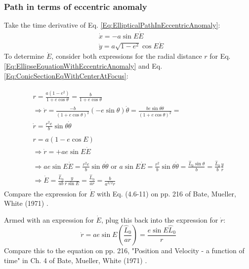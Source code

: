 \documentclass[10pt]{amsart}
\begin{document}
\begin{multicols*}{2}
\subsubsection{Path in terms of eccentric anomaly}

Take the time derivative of Eq. \ref{Eq:EllipticalPathInEccentricAnomaly}:
\begin{equation}
\begin{aligned}
& \dot{x} = -a \sin{E} \dot{E} \\ 
& \dot{y} = a\sqrt{1 - e^2} \cos{E} \dot{E} 
\end{aligned} 
\end{equation}
To determine $\dot{E}$, consider both expressions for the radial distance $r$ for Eq. \ref{Eq:EllipseEquationWithEccentricAnomaly} and Eq. \ref{Eq:ConicSectionEqWithCenterAtFocus}:

\[
\begin{gathered} 
\begin{gathered} 
	r = \frac{a (1-e^2) }{ 1 + e\cos{\theta}} = \frac{b}{ 1 + e\cos{\theta}} \\
	\Longrightarrow \dot{r} = \frac{ -b}{ (1+e\cos{\theta})^2} (-e\sin{\theta})\dot{\theta} = \frac{ be \sin{\theta} \dot{\theta} }{ (1+ e\cos{\theta})^2 } = \\
		\dot{r} = \frac{r^2 e}{b} \sin{\theta} \dot{\theta}
\end{gathered} \\ 
\begin{gathered}
r = a(1 - e\cos{E}) \\
\Longrightarrow \dot{r}  = +ae\sin{E} \dot{E} 
\end{gathered} \\
\begin{gathered}
\Longrightarrow ae \sin{E} \dot{E} = \frac{r^2 e}{b} \sin{\theta} \dot{\theta} \text{ or } a\sin{E} \dot{E} = \frac{r^2}{b} \sin{\theta} \dot{\theta} = \frac{ \widehat{L}_0 \sin{\theta} }{ b} = \frac{\widehat{L}_0 }{b} \frac{y}{r} \\
\Longrightarrow \dot{E} = \frac{ \widehat{L}_0 }{ab} \frac{y}{r\sin{E}} = \frac{\widehat{L}_0 } {ar} = \frac{ b}{ a^{3/2} r} 
\end{gathered}
\end{gathered} 
\]
Compare the expression for $\dot{E}$ with Eq. (4.6-11) on pp. 216 of Bate, Mueller, White (1971) \cite{BMW1971}.

Armed with an expression for $\dot{E}$, plug this back into the expression for $\dot{r}$:
\begin{equation}
\dot{r} = a e \sin{E} \left( \frac{ \widehat{L}_0 }{ ar} \right) = \frac{ e\sin{E} \widehat{L}_0 }{ r}
\end{equation}
Compare this to the equation on pp. 216, "Position and Velocity - a function of time" in Ch. 4 of Bate, Mueller, White (1971) \cite{BMW1971}. 


\end{multicols*}
\end{document}
